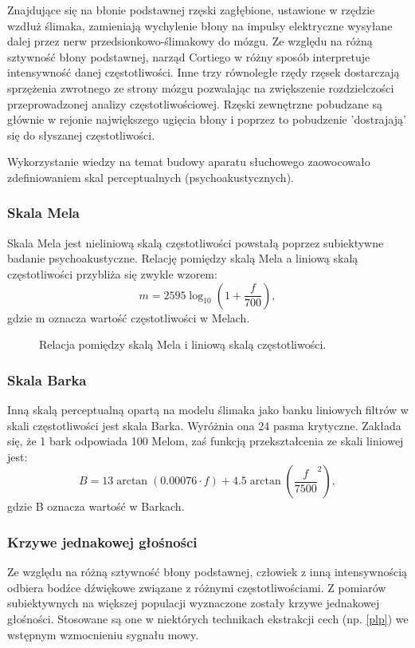 Znajdujące się na błonie podstawnej rzęski zagłębione, ustawione w rzędzie wzdłuż ślimaka, zamieniają wychylenie błony na impulsy elektryczne wysyłane dalej przez nerw przedsionkowo-ślimakowy do mózgu. Ze względu na różną sztywność błony podstawnej, narząd Cortiego w różny sposób interpretuje intensywność danej częstotliwości. Inne trzy równoległe rzędy rzęsek dostarczają sprzężenia zwrotnego ze strony mózgu pozwalając na zwiększenie rozdzielczości przeprowadzonej analizy częstotliwościowej. Rzęski zewnętrzne pobudzane są głównie w rejonie największego ugięcia błony i poprzez to pobudzenie 'dostrajają' się do słyszanej częstotliwości.

Wykorzystanie wiedzy na temat budowy aparatu słuchowego zaowocowało zdefiniowaniem skal perceptualnych (psychoakustycznych).
\subsubsection{Skala Mela \label{mel}}
Skala Mela jest nieliniową skalą częstotliwości powstałą poprzez subiektywne badanie psychoakustyczne. Relację pomiędzy skalą Mela a liniową skalą częstotliwości przybliża się zwykle wzorem:
\begin{equation}
  m = 2595\log_{10} \left( 1+ \frac{f}{700}\right),
\end{equation}
gdzie m oznacza wartość częstotliwości w Melach.

\begin{figure}[ht!]
  \centering
    
    \caption{\label{fig:mel} Relacja pomiędzy skalą Mela i liniową skalą częstotliwości.}
\end{figure}
\subsubsection{Skala Barka \label{bark}}
Inną skalą perceptualną opartą na modelu ślimaka jako banku liniowych filtrów w skali częstotliwości jest skala Barka. Wyróżnia ona 24 pasma krytyczne. Zakłada się, że 1 bark odpowiada 100 Melom, zaś funkcją przekształcenia ze skali liniowej jest:
\begin{equation}
  B = 13 \arctan \left( 0.00076\cdot f \right)+4.5\arctan\left(\frac{f}{7500}^2\right),
\end{equation}
gdzie B oznacza wartość w Barkach.

\subsubsection{Krzywe jednakowej głośności }
Ze względu na różną sztywność błony podstawnej, człowiek z inną intensywnością odbiera bodźce dźwiękowe związane z różnymi częstotliwościami. Z pomiarów subiektywnych na większej populacji wyznaczone zostały krzywe jednakowej głośności. Stosowane są one w niektórych technikach ekstrakcji cech (np. \ref{plp}) we wstępnym wzmocnieniu sygnału mowy.

